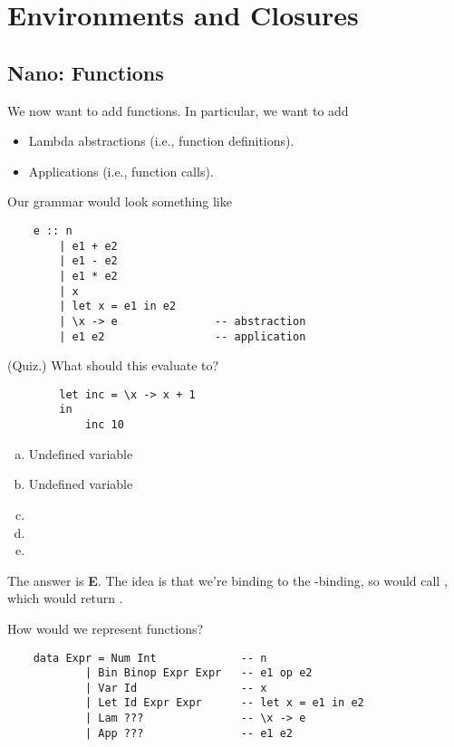 \documentclass[letterpaper]{article}
\begin{document}
\section{Environments and Closures}
\subsection{Nano: Functions}
We now want to add functions. In particular, we want to add 
\begin{itemize}
    \item Lambda abstractions (i.e., function definitions).
    \item Applications (i.e., function calls).
\end{itemize}
Our grammar would look something like
\begin{verbatim}
    e :: n 
        | e1 + e2 
        | e1 - e2 
        | e1 * e2 
        | x 
        | let x = e1 in e2
        | \x -> e               -- abstraction
        | e1 e2                 -- application \end{verbatim}

\begin{mdframed}[]
    (Quiz.) What should this evaluate to? 
    \begin{verbatim}
        let inc = \x -> x + 1 
        in 
            inc 10 \end{verbatim}
    \begin{enumerate}[(a)]
        \item Undefined variable 
        \item Undefined variable 
        \item {}
        \item {}
        \item {}
    \end{enumerate}

    \begin{mdframed}[]
        The answer is \textbf{E}. The idea is that we're binding  to the -binding, so  would call , which would return .
    \end{mdframed}
\end{mdframed}
How would we represent functions? 
\begin{verbatim}
    data Expr = Num Int             -- n
            | Bin Binop Expr Expr   -- e1 op e2 
            | Var Id                -- x
            | Let Id Expr Expr      -- let x = e1 in e2 
            | Lam ???               -- \x -> e 
            | App ???               -- e1 e2\end{verbatim}
\end{document}
